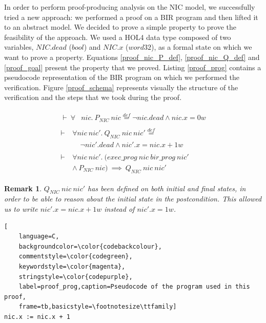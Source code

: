 \documentclass[10pt,a4paper]{article}
\newcommand{\eqdef}{\stackrel{def}{=}}
\newtheorem{remark}{Remark}
\begin{document}
\begin{multicols}{2}
In order to perform proof-producing analysis on the NIC model, we successfully tried a new approach: we performed a proof on a BIR program and then lifted it to an abstract model. We decided to prove a simple property to prove the feasibility of the approach. We used a HOL4 data type composed of two variables, $NIC.dead$ ($bool$) and $NIC.x$ ($word32$), as a formal state on which we want to prove a property. Equations \ref{proof_nic_P_def}, \ref{proof_nic_Q_def} and \ref{proof_goal} present the property that we proved. Listing \ref{proof_prog} contains a pseudocode representation of the BIR program on which we performed the verification. Figure \ref{proof_schema} represents visually the structure of the verification and the steps that we took during the proof.
%
\begin{small}
\begin{align}
  \begin{split}
    \label{proof_nic_P_def}
    \vdash~\forall &nic.~P_{NIC}~nic \eqdef \neg nic.dead \land nic.x = 0w
  \end{split}\\
  \begin{split}
    \label{proof_nic_Q_def}
    \vdash~&\forall nic~nic'.~Q_{NIC}~nic~nic' \eqdef\\
      &~~~~~\neg nic'.dead \land nic'.x = nic.x + 1w
  \end{split}\\
  \begin{split}
    \label{proof_goal}
    \vdash~&\forall nic~nic'.~(exec\_prog~nic~bir\_prog~nic'\\
      &\land~P_{NIC}~nic)~\implies~Q_{NIC}~nic~nic'
  \end{split}
\end{align}
\end{small}
%
\begin{remark} \label{remark_Q_nic_intial_final}
  $Q_{NIC}~nic~nic'$ has been defined on both initial and final states, in order to be able to reason about the initial state in the postcondition. This allowed us to write $nic'.x = nic.x + 1w$ instead of $nic'.x = 1w$.
\end{remark}
%
\begin{lstlisting}[
    language=C,
    backgroundcolor=\color{codebackcolour},
    commentstyle=\color{codegreen},
    keywordstyle=\color{magenta},
    stringstyle=\color{codepurple},
    label=proof_prog,caption=Pseudocode of the program used in this proof,
    frame=tb,basicstyle=\footnotesize\ttfamily]
nic.x := nic.x + 1

\end{lstlisting}
\end{multicols}
\end{document}
